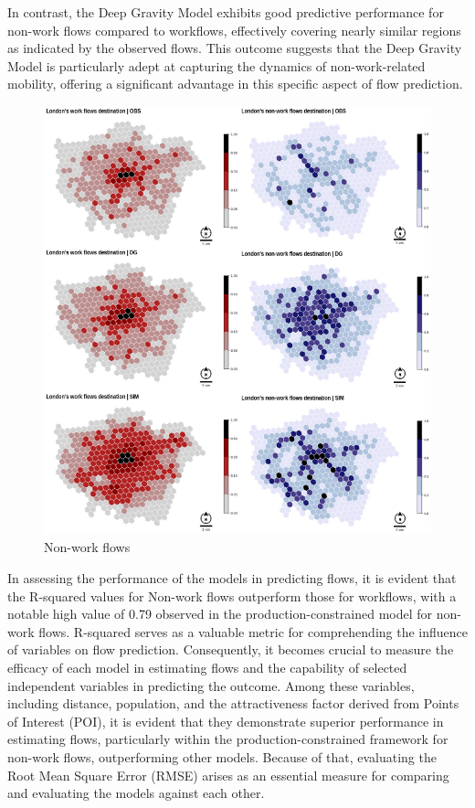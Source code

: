     In contrast, the Deep Gravity Model exhibits good predictive performance for non-work flows compared to workflows, effectively covering nearly similar regions as indicated by the observed flows. This outcome suggests that the Deep Gravity Model is particularly adept at capturing the dynamics of non-work-related mobility, offering a significant advantage in this specific aspect of flow prediction.
        
        \begin{figure}[H]
            \centering
            \includegraphics[width=15cm]{Images/Hex_comparativeanalysis.png}
            \caption{Non-work flows}
            \label{fig: nWF Model after calibration}
        \end{figure}

    In assessing the performance of the models in predicting flows, it is evident that the R-squared values for Non-work flows outperform those for workflows, with a notable high value of 0.79 observed in the production-constrained model for non-work flows. R-squared serves as a valuable metric for comprehending the influence of variables on flow prediction. Consequently, it becomes crucial to measure the efficacy of each model in estimating flows and the capability of selected independent variables in predicting the outcome. Among these variables, including distance, population, and the attractiveness factor derived from Points of Interest (POI), it is evident that they demonstrate superior performance in estimating flows, particularly within the production-constrained framework for non-work flows, outperforming other models. Because of that, evaluating the Root Mean Square Error (RMSE) arises as an essential measure for comparing and evaluating the models against each other.

